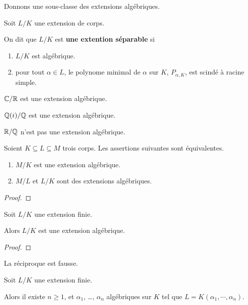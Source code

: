 Donnons une sous-classe des extensions algébriques.

\begin{definition} 
	Soit $L/K$ une extension de corps.

	On dit que $L/K$ est \textbf{une extention séparable} si
	\begin{enumerate}
		\item $L/K$ est algébrique.
		\item pour tout $\alpha \in L$, le polynome minimal de $\alpha$ sur $K$,
			$P_{\alpha, K}$, est scindé à racine simple.
	\end{enumerate}
\end{definition}

\begin{exemple}
	$\mathbb{C}/\mathbb{R}$ est une extension algébrique.

	$\mathbb{Q}(i)/\mathbb{Q}$ est une extension algébrique.

	$\mathbb{R}/\mathbb{Q}$ n'est pas une extension algébrique.
\end{exemple}

\begin{proposition}
	Soient $K \subseteq L \subseteq M$ trois corps. Les assertions suivantes sont
	équivalentes.
	\begin{enumerate}
		\item $M/K$ est une extension algébrique.
		\item $M/L$ et $L/K$ sont des extensions algébriques.
	\end{enumerate}
\end{proposition}

\ifdefined\outputproof
\begin{proof}

\end{proof}
\fi

\begin{proposition}
	Soit $L/K$ une extension finie.

	Alors $L/K$ est une extension algébrique.
\end{proposition}

\ifdefined\outputproof
\begin{proof}

\end{proof}
\fi

\begin{remarque}
	La réciproque est fausse.
\end{remarque}

\begin{proposition}
	Soit $L/K$ une extension finie.

	Alors il existe $n \geq 1$, et $\alpha_{1}$, \ldots, $\alpha_{n}$
	algébriques sur $K$ tel que $L = K(\alpha_{1}, \cdots, \alpha_{n})$.
\end{proposition}

